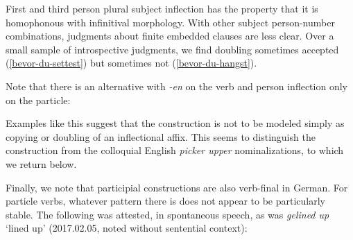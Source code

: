 \documentclass[output=paper]{langscibook}
\begin{document}
\ea
{} 
\z\z 

\begin{sloppypar}
First and third person plural subject inflection has the property that it is homophonous with infinitival morphology. With other subject person-number combinations, judgments about finite embedded clauses are less clear. Over a small sample of introspective judgments, we find doubling sometimes accepted (\ref{bevor-du-settest}) but sometimes not (\ref{bevor-du-hangst}). 
\end{sloppypar}

\ea
{}
\z\z

Note that there is an alternative with \textit{-en} on the verb and person inflection only on the particle:

\ea\label{bevor-du}
\z\z 

Examples like this suggest that the construction is not to be modeled simply as copying or doubling of an inflectional affix. This seems to distinguish the construction from the colloquial English \textit{picker upper} nominalizations, to which we return below.   

Finally, we note that participial constructions are also verb-final in German. For particle verbs, whatever pattern there is does not appear to be  particularly stable. The following was attested, in spontaneous speech, as was \textit{gelined up} `lined up' (2017.02.05, noted without sentential context):
\end{document}
